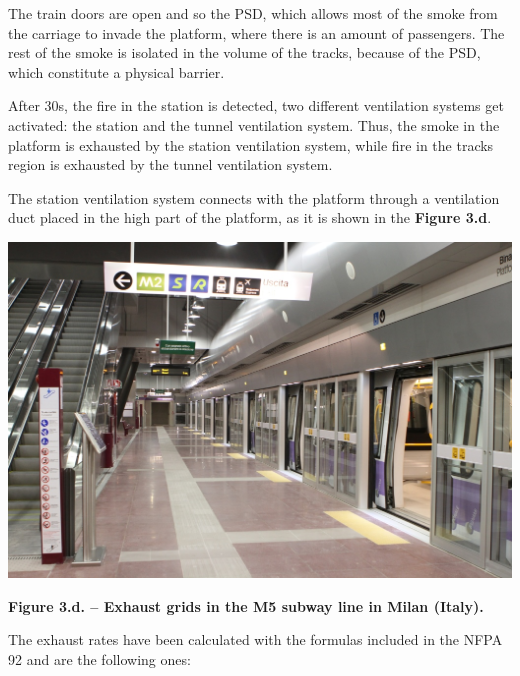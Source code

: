 \documentclass{article}
\begin{document}
The train doors are open and so the PSD, which allows most of the smoke from the 
carriage to invade the platform, where there is an amount of passengers. The rest 
of the smoke is isolated in the volume of the tracks, because of the PSD, which 
constitute a physical barrier.%

After 30s, the fire in the station is detected, two different ventilation systems 
get activated: the station and the tunnel ventilation system. Thus, the smoke in the 
platform is exhausted by the station ventilation system, while fire in the tracks 
region is exhausted by the tunnel ventilation system.%

The station ventilation system connects with the platform through a ventilation duct 
placed in the high part of the platform, as it is shown in the \textbf{Figure 3.d}.%

\begin{mdcenter}%

\noindent{}\includegraphics[keepaspectratio=true,width=\dimmin{}{\dimwidth{0.50}}]{images/Fig-3.d}{}%
\end{mdcenter}%

\begin{mdcenter}%

\noindent{}\textbf{Figure 3.d. – Exhaust grids in the M5 subway line in Milan (Italy).}%
\end{mdcenter}%

\noindent{}The exhaust rates have been calculated with the formulas included in the NFPA 92 
and are the following ones:%
\end{document}
